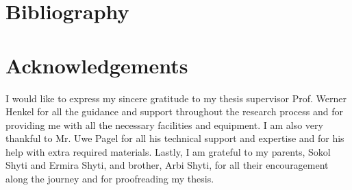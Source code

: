\documentclass[a4paper,11pt,oneside]{article}
\begin{document}






  
  
  


  \newpage
  \section*{Bibliography}
  \printbibliography

  \newpage
  \section*{Acknowledgements}
  
  I would like to express my sincere gratitude to my thesis supervisor Prof. Werner Henkel for all the guidance and support throughout the research process and for providing me with all the necessary facilities and equipment. I am also very thankful to Mr. Uwe Pagel for all his technical support and expertise and for his help with extra required materials. Lastly, I am grateful to my parents, Sokol Shyti and Ermira Shyti, and brother, Arbi Shyti, for all their encouragement along the journey and for proofreading my thesis.  
\end{document}

